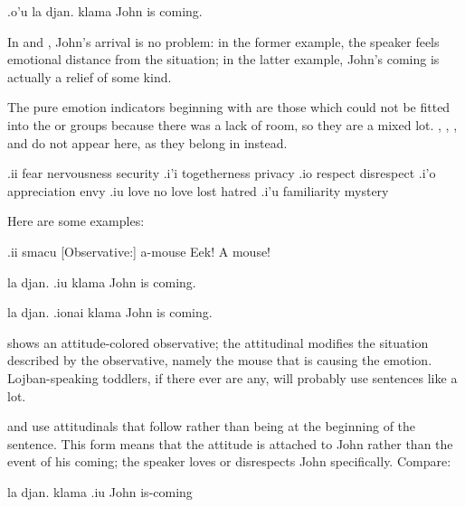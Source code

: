 \begin{example}
.o'u la djan. klama\n
{} John is coming.
\end{example}

In  and , John's arrival is no problem:
    in the former example, the speaker feels emotional distance
    from the situation; in the latter example, John's coming is
    actually a relief of some kind.

The pure emotion indicators beginning with  are those
    which could not be fitted into the  or  groups
    because there was a lack of room, so they are a mixed lot.
    , , , and  do not appear here, as
    they belong in  instead.

   .ii fear        nervousness security
    .i'i    togetherness            privacy
    .io respect             disrespect
    .i'o    appreciation            envy
    .iu     love        no love lost    hatred
    .i'u    familiarity         mystery

Here are some examples:
\begin{example}
.ii smacu\n
{} [Observative:] a-mouse\n
Eek!  A mouse!
\end{example}

\begin{example}
la djan. .iu klama\n
John  is coming.
\end{example}

\begin{example}
la djan. .ionai klama\n
John  is coming.
\end{example}

 shows an attitude-colored
    observative; the attitudinal modifies the situation described
    by the observative, namely the mouse that is causing the
    emotion. Lojban-speaking toddlers, if there ever are any, will
    probably use sentences like  a
    lot. 

 and  use attitudinals that follow
     rather than being at the beginning of the
    sentence. This form means that the attitude is attached to John
    rather than the event of his coming; the speaker loves or
    disrespects John specifically. Compare:
\begin{example}
la djan. klama .iu\n
John is-coming 
\end{example}

